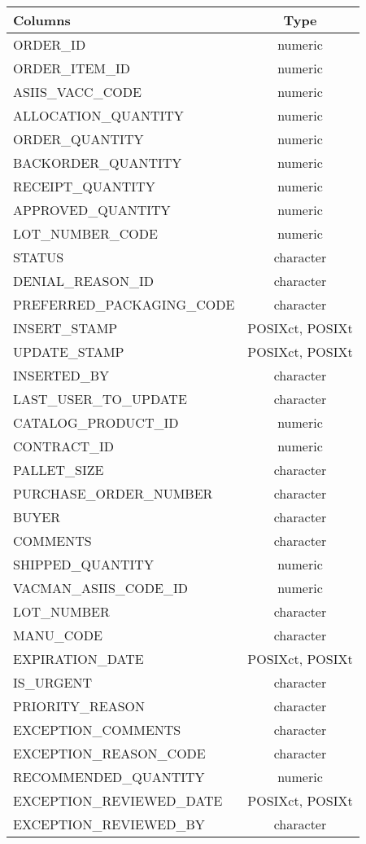 \documentclass[
  letterpaper,
  DIV=11,
  numbers=noendperiod]{scrreprt}
\begin{document}
\begin{longtable}{lc}
\toprule
Columns & Type \\ 
\midrule
ORDER\_ID & numeric \\ 
ORDER\_ITEM\_ID & numeric \\ 
ASIIS\_VACC\_CODE & numeric \\ 
ALLOCATION\_QUANTITY & numeric \\ 
ORDER\_QUANTITY & numeric \\ 
BACKORDER\_QUANTITY & numeric \\ 
RECEIPT\_QUANTITY & numeric \\ 
APPROVED\_QUANTITY & numeric \\ 
LOT\_NUMBER\_CODE & numeric \\ 
STATUS & character \\ 
DENIAL\_REASON\_ID & character \\ 
PREFERRED\_PACKAGING\_CODE & character \\ 
INSERT\_STAMP & POSIXct, POSIXt \\ 
UPDATE\_STAMP & POSIXct, POSIXt \\ 
INSERTED\_BY & character \\ 
LAST\_USER\_TO\_UPDATE & character \\ 
CATALOG\_PRODUCT\_ID & numeric \\ 
CONTRACT\_ID & numeric \\ 
PALLET\_SIZE & character \\ 
PURCHASE\_ORDER\_NUMBER & character \\ 
BUYER & character \\ 
COMMENTS & character \\ 
SHIPPED\_QUANTITY & numeric \\ 
VACMAN\_ASIIS\_CODE\_ID & numeric \\ 
LOT\_NUMBER & character \\ 
MANU\_CODE & character \\ 
EXPIRATION\_DATE & POSIXct, POSIXt \\ 
IS\_URGENT & character \\ 
PRIORITY\_REASON & character \\ 
EXCEPTION\_COMMENTS & character \\ 
EXCEPTION\_REASON\_CODE & character \\ 
RECOMMENDED\_QUANTITY & numeric \\ 
EXCEPTION\_REVIEWED\_DATE & POSIXct, POSIXt \\ 
EXCEPTION\_REVIEWED\_BY & character \\ 

\end{longtable}
\end{document}
